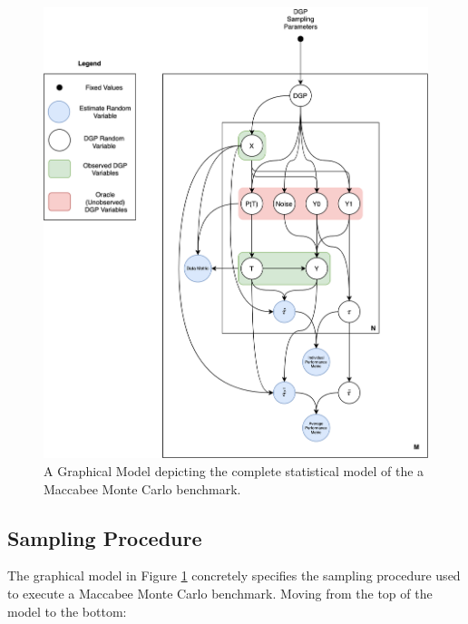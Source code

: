 \documentclass[../main.tex]{subfiles}
\begin{document}
\begin{figure}[ht!]
    \centering
    \includegraphics[width=1\linewidth]{figures/ch5-maccabee-design-graphical-model-fig.png}
    \caption{A Graphical Model depicting the complete statistical model of the a Maccabee Monte Carlo benchmark.}
    \label{fig:mac-graph-model}
\end{figure}
\FloatBarrier

\subsection{Sampling Procedure}

The graphical model in Figure \ref{fig:mac-graph-model} concretely specifies the sampling procedure used to execute a Maccabee Monte Carlo benchmark. Moving from the top of the model to the bottom:
\end{document}
